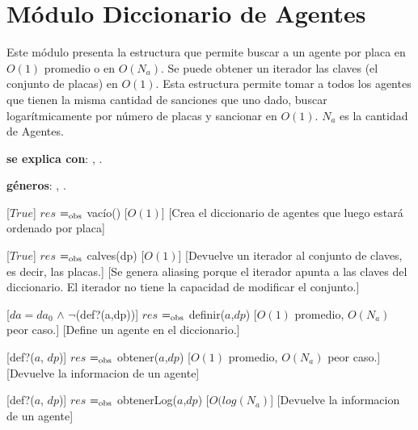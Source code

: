 \section{M\'odulo Diccionario de Agentes}

Este m\'odulo presenta la estructura que permite buscar a un agente por placa en $O(1)$ promedio o en $O(N_{a})$. Se puede obtener un iterador las claves (el conjunto de placas) en $O(1)$. Esta estructura permite tomar a todos los agentes que tienen la misma cantidad de sanciones que uno dado, buscar logarítmicamente por número de placas y sancionar en $O(1)$.
$N_{a}$ es la cantidad de Agentes.

\begin{Interfaz}

		\textbf{se explica con}:         
            , 
            .
 \par 
		\textbf{g\'eneros}: 
            , 
            . 

      [$True$]
      {$res$ $=_{\mathrm{obs}}$ vac\'io()}
      [$O(1)$]
      [Crea el diccionario de agentes que luego estar\'a ordenado por placa]

      [$True$]
      {$res$ $=_{\mathrm{obs}}$ calves(dp)}
      [$O(1)$]
      [Devuelve un iterador al conjunto de claves, es decir, las placas.]
      [Se genera aliasing porque el iterador apunta a las claves del diccionario. El iterador no tiene la capacidad de modificar el conjunto.]

      [$da = da_{0}$ $\land$ $\lnot$(def?(a,dp))]
      {$res$ $=_{\mathrm{obs}}$ definir($a$,$dp$)}
      [$O(1)$ promedio, $O(N_{a})$ peor caso.]
      [Define un agente en el diccionario.]

      [def?($a$, $dp$)]
      {$res$ $=_{\mathrm{obs}}$ obtener($a$,$dp$)}
      [$O(1)$ promedio, $O(N_{a})$ peor caso.]
      [Devuelve la informacion de un agente]

      [def?($a$, $dp$)]
      {$res$ $=_{\mathrm{obs}}$ obtenerLog($a$,$dp$)}
      [$O(log(N_{a})$]
      [Devuelve la informacion de un agente]


\end{Interfaz}
